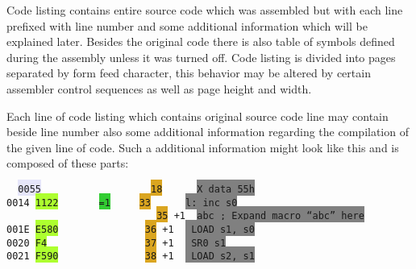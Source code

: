                 Code listing contains entire source code which was assembled but with each line prefixed with line number and some additional information which will be explained later. Besides the original code there is also table of symbols defined during the assembly unless it was turned off. Code listing is divided into pages separated by form feed character, this behavior may be altered by certain assembler control sequences as well as page height and width.

                Each line of code listing which contains original source code line may contain beside line number also some additional information regarding the compilation of the given line of code. Such a additional information might look like this and is composed of these parts:

                \begin{code}[h]
                        \verb'  '\texttt{\colorbox{Lavender}{0055}}\verb'                   '\texttt{\colorbox{Goldenrod}{18}}\verb'      '\texttt{\colorbox{Gray}{X      data     55h}} \\
                        \texttt{\colorbox{Apricot}{0014}}\verb' '\texttt{\colorbox{GreenYellow}{1122}}\verb'       '\texttt{\colorbox{LimeGreen}{=1}}\verb'     '\texttt{\colorbox{Goldenrod}{33}}\verb'      '\texttt{\colorbox{Gray}{l:     inc      s0}} \\
                        \verb'                          '\texttt{\colorbox{Goldenrod}{35}}\verb' '\texttt{\colorbox{ProcessBlue}{+1}}\verb'  '\texttt{\colorbox{Gray}{abc     ; Expand macro ``abc'' here}} \\
                        \texttt{\colorbox{Apricot}{001E}}\verb' '\texttt{\colorbox{GreenYellow}{E580}}\verb'               '\texttt{\colorbox{Goldenrod}{36}}\verb' '\texttt{\colorbox{ProcessBlue}{+1}}\verb'  '\texttt{\colorbox{Gray}{                LOAD     s1, s0}} \\
                        \texttt{\colorbox{Apricot}{0020}}\verb' '\texttt{\colorbox{GreenYellow}{F4}}\verb'                 '\texttt{\colorbox{Goldenrod}{37}}\verb' '\texttt{\colorbox{ProcessBlue}{+1}}\verb'  '\texttt{\colorbox{Gray}{                SR0     s1}} \\
                        \texttt{\colorbox{Apricot}{0021}}\verb' '\texttt{\colorbox{GreenYellow}{F590}}\verb'               '\texttt{\colorbox{Goldenrod}{38}}\verb' '\texttt{\colorbox{ProcessBlue}{+1}}\verb'  '\texttt{\colorbox{Gray}{                LOAD     s2, s1}} \\\\

\end{code}
